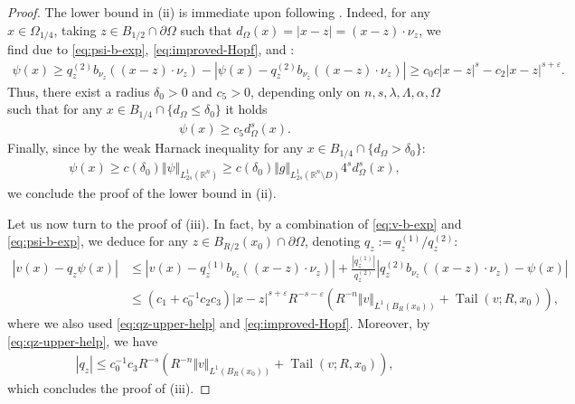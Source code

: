 \documentclass[11pt,reqno]{amsart}
\theoremstyle{plain}
\theoremstyle{definition}
\numberwithin{equation}{section}
\newcommand{\R}{\mathbb{R}}
\newcommand{\eps}{\varepsilon}
\newcommand{\1}{\mathbbm{1}}
\DeclareMathOperator{\tail}{Tail}
\begin{document}
\begin{proof}
The lower bound in (ii) is immediate upon following \cite[Step 3 in the proof of Theorem~6.10]{RoWe24}. Indeed, for any $x \in \Omega_{1/4}$, taking $z \in B_{1/2} \cap \partial \Omega$ such that $d_{\Omega}(x) = |x-z| = (x-z) \cdot \nu_z$, we find due to \eqref{eq:psi-b-exp}, \eqref{eq:improved-Hopf}, and \cite[Theorem~1.4]{RoWe24}:
\begin{align*}
\psi(x) \ge q^{(2)}_z b_{\nu_z}((x-z) \cdot \nu_z) - |\psi(x) - q^{(2)}_z b_{\nu_z}((x-z) \cdot \nu_z)| \ge c_0 c |x-z|^s - c_2 |x-z|^{s+\eps}.
\end{align*}
Thus, there exist a radius $\delta_0 > 0$ and $c_5 > 0$, depending only on $n,s,\lambda,\Lambda,\alpha,\Omega$ such that for any $x \in B_{1/4} \cap \{d_{\Omega} \le \delta_0 \}$ it holds
\begin{align*}
\psi(x) \ge c_5 d^s_{\Omega}(x).
\end{align*}
Finally, since by the weak Harnack inequality for any $x \in B_{1/4} \cap \{d_{\Omega} > \delta_0 \}$:
\begin{align*}
\psi(x) \ge c(\delta_0) \Vert \psi \Vert_{L^1_{2s}(\R^n)} \ge c(\delta_0) \Vert g \Vert_{L^1_{2s}(\R^n \setminus D)} 4^s d_{\Omega}^s(x),
\end{align*}
we conclude the proof of the lower bound in (ii).

Let us now turn to the proof of (iii). In fact, by a combination of \eqref{eq:v-b-exp} and \eqref{eq:psi-b-exp}, we deduce for any $z \in B_{R/2}(x_0) \cap \partial \Omega$, denoting $q_z := q_z^{(1)}/q_z^{(2)}$:
\begin{align*}
|v(x) - q_z \psi(x)| &\le |v(x) - q_z^{(1)}b_{\nu_z}((x-z) \cdot \nu_z)| + \frac{|q_z^{(1)}|}{q_z^{(2)}}|q_z^{(2)} b_{\nu_z}((x-z) \cdot \nu_z) - \psi(x)| \\
&\le (c_1 + c_0^{-1} c_2 c_3 )|x-z|^{s+\eps} R^{-s-\eps} \left(R^{-n}\Vert v \Vert_{L^1(B_R(x_0))} + \tail(v;R,x_0) \right),
\end{align*}
where we also used \eqref{eq:qz-upper-help} and \eqref{eq:improved-Hopf}. Moreover, by \eqref{eq:qz-upper-help}, we have 
\begin{align*}
  |q_z| \le c_0^{-1}c_3  R^{-s} \left(R^{-n}\Vert v \Vert_{L^1(B_R(x_0))} + \tail(v;R,x_0) \right),
\end{align*}
which concludes the proof of (iii).


\end{proof}
\end{document}
